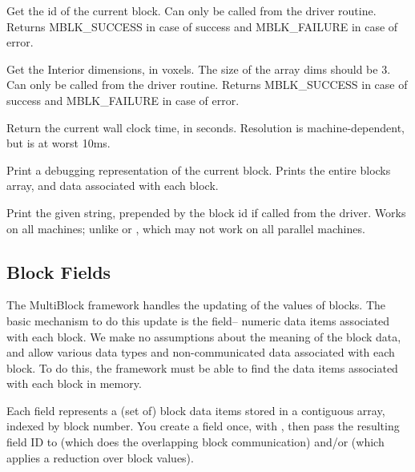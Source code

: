 \documentclass[10pt]{article}
\begin{document}
     Get the id of the current block. Can only be called from the driver 
     routine. Returns MBLK\_SUCCESS in case of success and MBLK\_FAILURE in 
     case of error.
\vspace{0.2in}

     Get the Interior dimensions, in voxels. The size of the array dims should
     be 3. Can only be called from the driver routine. Returns MBLK\_SUCCESS 
     in case of success and MBLK\_FAILURE in case of error.
\vspace{0.2in}


     Return the current wall clock time, in seconds.  Resolution is
     machine-dependent, but is at worst 10ms.
\vspace{0.2in}


     Print a debugging representation of the current block.
     Prints the entire blocks array, and data associated with
     each block.
\vspace{0.2in}


     Print the given string, prepended by the block id if called from the 
     driver. Works on all machines; unlike  or
     , which may not work on all parallel machines.


\subsection{Block Fields}


The MultiBlock framework handles the updating of the values of blocks.
The basic mechanism to do this update is the field-- numeric data items associated with each block. We make no assumptions about the meaning of the block data, and allow various data types and non-communicated data associated with each
block.  To do this, the framework must be able to find the data items
associated with each block in memory.

Each field represents a (set of) block data items stored in a contiguous array,
indexed by block number.  You create a field once, with , then pass the resulting field ID to  (which does the
overlapping block communication) and/or  (which applies a reduction over block values).
\vspace{0.2in}
\end{document}
